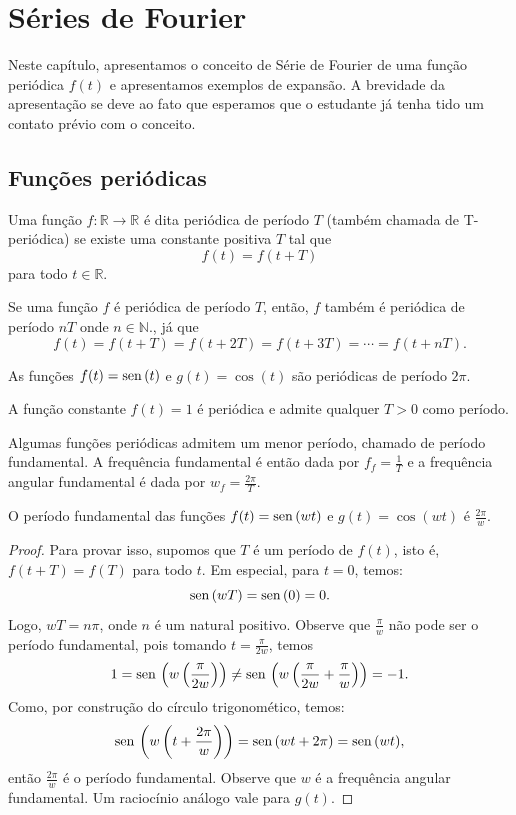 \chapter{Séries de Fourier} %
Neste capítulo, apresentamos o conceito de Série de Fourier de uma função periódica $f(t)$ e apresentamos exemplos de expansão. A brevidade da apresentação se deve ao fato que esperamos que o estudante já tenha tido um contato prévio com o conceito.
\section{Funções periódicas}
\begin{defn} Uma função $f:\mathbb{R}\to\mathbb{R}$ é dita periódica de período $T$ (também chamada de T-periódica) se existe uma constante positiva $T$ tal que
\begin{equation}f(t)=f(t+T)\end{equation}
para todo $t\in\mathbb{R}.$
\end{defn}
\begin{obs} Se uma função $f$ é periódica de período $T$, então, $f$ também é periódica de período $nT$ onde $n\in\mathbb{N}.$, já que
\begin{equation}f(t)=f(t+T)=f(t+2T)=f(t+3T)=\cdots =f(t+nT).\end{equation}
 \end{obs}
 \begin{ex}
  As funções $f(t)=\operatorname{sen}\,(t)$ e $g(t)=\cos(t)$ são periódicas de período $2\pi$.
 \end{ex}
\begin{ex}
  A função constante $f(t)=1$ é periódica e admite qualquer $T>0$ como período.
 \end{ex}
\begin{defn} Algumas funções periódicas admitem um menor período, chamado de período fundamental. A frequência fundamental é então dada por $f_f=\frac{1}{T}$ e a frequência angular fundamental é dada por $w_f=\frac{2\pi}{T}$.
 \end{defn}
\begin{prop}O período fundamental das funções $f(t)=\operatorname{sen}\,(wt)$ e $g(t)=\cos(wt)$ é $\frac{2\pi}{w} $. 
\end{prop}
\begin{proof} Para provar isso, supomos que $T$ é um período de $f(t)$, isto é, $f(t+T)=f(T)$ para todo $t$. Em especial, para $t=0$, temos: 
$$
\operatorname{sen}\,(wT)=\operatorname{sen}\,(0)=0.
$$
Logo, $wT=n\pi$, onde $n$ é um natural positivo. Observe que $\frac{\pi}{w}$ não pode ser o período fundamental, pois tomando $t=\frac{\pi}{2w}$, temos
\begin{equation}1=\operatorname{sen}\,\left(w\left(\frac{\pi}{2w}\right)\right)\neq \operatorname{sen}\,\left(w\left(\frac{\pi}{2w}+\frac{\pi}{w}\right)\right)=-1.\end{equation}
Como, por construção do círculo trigonomético, temos:
$$
\operatorname{sen}\,\left(w\left(t+\frac{2\pi}{w}\right)\right)=\operatorname{sen}\,(wt+2\pi)=\operatorname{sen}\,(wt),
$$ 
então $\frac{2\pi}{w}$ é o período fundamental. Observe que $w$ é a frequência angular fundamental. Um raciocínio análogo vale para $g(t)$.
\end{proof}
